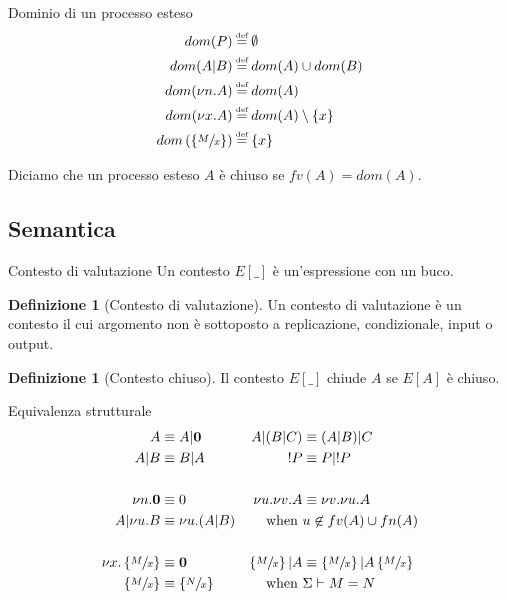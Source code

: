 \documentclass{beamer}
\newcounter{counter1}
\theoremstyle{plain}
\theoremstyle{definition}
\newtheorem{mydef}[counter1]{Definizione}
\theoremstyle{remark}
\newcommand{\set}[1]{\left\{#1\right\}}
\newcommand{\pa}[1]{\left(#1\right)}
\newcommand*{\eqdef}{\ensuremath{\overset{\mathclap{\text{\tiny def}}}{=}}}
\begin{document}
\begin{frame}{Dominio di un processo esteso}
  \begin{align*}
    dom(P) & \eqdef \emptyset \\
    dom(A|B) & \eqdef dom(A) \cup dom(B) \\
    dom(\nu n.A) & \eqdef dom(A) \\
    dom(\nu x.A) & \eqdef dom(A) \setminus \set{x}\\
    dom\pa{ \set{ \sfrac{M}{x}}} & \eqdef \set{x}           
  \end{align*}
  \vfill
  
  Diciamo che un processo esteso $A$ \`e chiuso se $fv(A) = dom(A)$.
\end{frame}

\subsection{Semantica}

\begin{frame}{Contesto di valutazione}
  Un contesto $E[\_]$ \`e un'espressione con un buco.
  \begin{mydef}[Contesto di valutazione]
    Un contesto di valutazione \`e un contesto il cui argomento non
    \`e sottoposto a replicazione, condizionale, input o output.
  \end{mydef}
  \begin{mydef}[Contesto chiuso]
    Il contesto $E[\_]$ chiude $A$ se $E[A]$ \`e chiuso.
  \end{mydef}
\end{frame}


\begin{frame}{Equivalenza strutturale}
  \begin{align*}
    A & \equiv A|\mathbf{0} & A|(B|C) & \equiv (A|B)|C \\
    A|B & \equiv B|A & !P & \equiv P|!P \\ \\
    \nu n.\mathbf{0} & \equiv 0 & \nu u. \nu v.A & \equiv \nu v. \nu
                                                   u.A \\
    A| \nu u.B & \equiv \nu u. (A|B) & \text{when } & u\not\in fv(A)
                                                     \cup fn(A) \\ \\
    \nu x. \set{\sfrac{M}{x}} & \equiv \mathbf{0} & \set{\sfrac{M}{x}}
                                                    |A & \equiv
                                                         \set{\sfrac{M}{x}}
                                                         |
                                                         A\set{\sfrac{M}{x}}
    \\
    \set{\sfrac{M}{x}} & \equiv \set{\sfrac{N}{x}} & \text{when } &
                                                                   \Sigma
                                                                   \vdash M=N
  \end{align*}
\end{frame}
\end{document}
